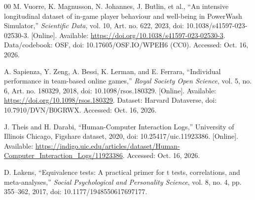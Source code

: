 \documentclass[conference]{IEEEtran}
\begin{document}
\begin{thebibliography}{00}
M. Vuorre, K. Magnusson, N. Johannes, J. Butlin, et al., ``An intensive longitudinal dataset of in-game player behaviour and well-being in PowerWash Simulator,'' \textit{Scientific Data}, vol. 10, Art. no. 622, 2023, doi: 10.1038/s41597-023-02530-3. [Online]. Available: \url{https://doi.org/10.1038/s41597-023-02530-3}. Data/codebook: OSF, doi: 10.17605/OSF.IO/WPEH6 (CC0). Accessed: Oct. 16, 2026.

A. Sapienza, Y. Zeng, A. Bessi, K. Lerman, and E. Ferrara, ``Individual performance in team-based online games,'' \textit{Royal Society Open Science}, vol. 5, no. 6, Art. no. 180329, 2018, doi: 10.1098/rsos.180329. [Online]. Available: \url{https://doi.org/10.1098/rsos.180329}. Dataset: Harvard Dataverse, doi: 10.7910/DVN/B0GRWX. Accessed: Oct. 16, 2026.

J. Theis and H. Darabi, ``Human-Computer Interaction Logs,'' University of Illinois Chicago, Figshare dataset, 2020, doi: 10.25417/uic.11923386. [Online]. Available: \url{https://indigo.uic.edu/articles/dataset/Human-Computer_Interaction_Logs/11923386}. Accessed: Oct. 16, 2026.

D. Lakens, ``Equivalence tests: A practical primer for t tests, correlations, and meta-analyses,'' \textit{Social Psychological and Personality Science}, vol. 8, no. 4, pp. 355--362, 2017, doi: 10.1177/1948550617697177.
\end{thebibliography}
\end{document}
